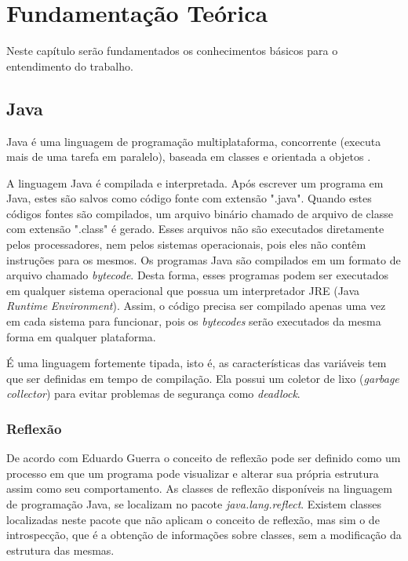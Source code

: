 \chapter{Fundamentação Teórica}
\label{ch:fundamentacao}
\par Neste capítulo ser\~ao fundamentados os conhecimentos b\'asicos para o entendimento do trabalho.

\section{Java}

\par Java é uma linguagem de programação multiplataforma, concorrente (executa mais de uma tarefa em paralelo), baseada em classes e orientada a objetos \cite{joy2000java}.
\par A linguagem Java é compilada e interpretada. Após escrever um programa em Java, estes são salvos como código fonte com extensão ".java". Quando estes códigos fontes são compilados, um arquivo binário chamado de arquivo de classe com extensão ".class" é gerado. Esses arquivos não são executados diretamente pelos processadores, nem pelos sistemas operacionais, pois eles não contêm instruções para os mesmos. Os programas Java são compilados em um formato de arquivo chamado \textit{bytecode}. Desta forma, esses programas podem ser executados em qualquer sistema operacional que possua um interpretador JRE (Java \textit{Runtime} \textit{Environment}). Assim, o código precisa ser compilado apenas uma vez em cada sistema para funcionar, pois os \textit{bytecodes} serão executados da mesma forma em qualquer plataforma\cite{indrusiak1996linguagem}.
\par É uma linguagem fortemente tipada, isto é, as características das variáveis tem que ser definidas em tempo de compilação. Ela possui um coletor de lixo (\textit{garbage collector}) para evitar problemas de segurança como \textit{deadlock}. \cite{joy2000java}

\subsection{Reflexão}

\par De acordo com Eduardo Guerra \citeyear{guerra2014componentes} o conceito de reflexão pode ser definido como um processo em que um programa pode visualizar e alterar sua própria estrutura assim como seu comportamento. As classes de reflexão disponíveis na linguagem de programação Java, se localizam no pacote \textit{java.lang.reflect}. Existem classes localizadas neste pacote que não aplicam o conceito de reflexão, mas sim o de introspecção, que é a obtenção de informações sobre classes, sem a modificação da estrutura das mesmas.

